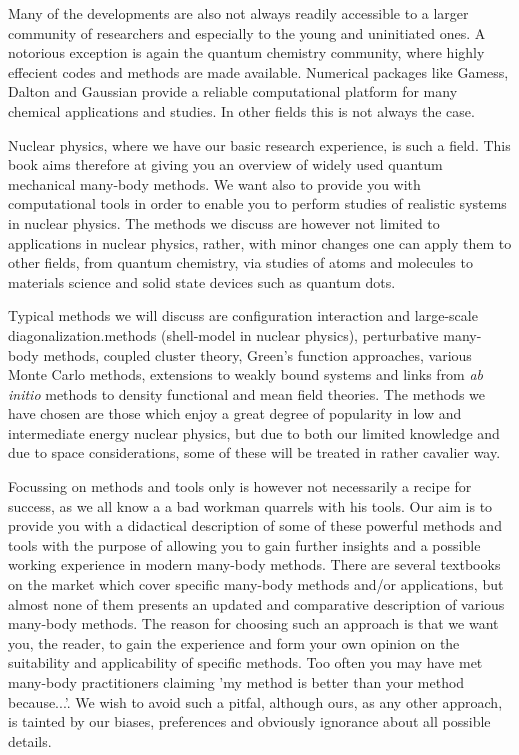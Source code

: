 \documentclass[graybox,sectrefs,envcountresetchap,open=right]{svmonodo}
\begin{document}
Many of the developments are also not 
always readily accessible to a larger community of
researchers and especially to the young and uninitiated ones. A notorious exception is 
again the quantum chemistry community, where highly effecient codes and methods are made available.  
Numerical packages like
Gamess, Dalton and Gaussian provide a reliable computational 
platform for many  chemical applications and studies.
In other fields this is not always the case.     

Nuclear physics, where we have our basic research experience, is such a field.
This book aims therefore at giving you an overview 
of widely used quantum mechanical  many-body methods. We want also to provide you with computational tools in order to enable you
to perform studies of realistic systems  in nuclear physics. 
The methods we discuss are however not limited to applications
in nuclear physics, rather, with  minor  changes one can apply them to other fields, from quantum chemistry, via studies of atoms and
molecules to materials science and solid state devices such as quantum dots.  

Typical methods we will discuss are 
configuration interaction and large-scale diagonalization.methods (shell-model in nuclear physics), perturbative many-body methods, 
coupled cluster theory, Green's function approaches, various Monte Carlo methods, extensions to weakly  bound systems and links
from \emph{ab initio} methods to  density functional and mean field theories. 
The methods we have chosen are those which enjoy a great degree of popularity in low and intermediate energy nuclear physics, 
but due to both our limited knowledge
and due to space considerations, some of these will be treated in rather cavalier way.

Focussing on methods and tools only is however not necessarily a recipe for success, as we all know a 
a bad workman quarrels with his tools. Our aim is to provide 
you with a didactical description
of some of these  powerful methods and tools with the purpose of allowing you to
gain further insights and a possible working experience in modern many-body methods.
There are several textbooks on the market which cover specific 
many-body methods and/or applications, but almost none of them
presents an updated and comparative description of various many-body methods. The reason for choosing such an approach
is that we want you, the reader, to gain the experience and form your own opinion on the suitability and applicability
of specific methods. Too often you may have met many-body practitioners
claiming 'my method is better than your method because...'.  We wish to avoid such a pitfal, although ours, as any other approach,
is tainted by our biases, preferences and obviously ignorance about all possible details. 
\end{document}
